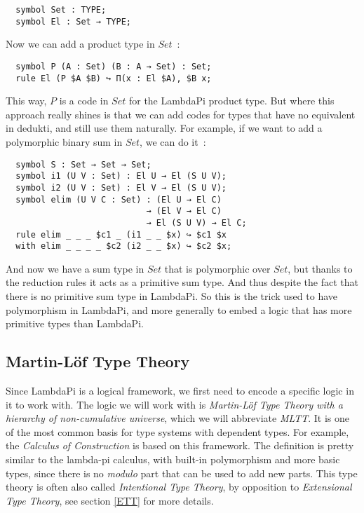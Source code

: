 \begin{lstlisting}
  symbol Set : TYPE;
  symbol El : Set → TYPE;
\end{lstlisting}

Now we can add a product type in $Set$~:

\begin{lstlisting}
  symbol P (A : Set) (B : A → Set) : Set;
  rule El (P $A $B) ↪ Π(x : El $A), $B x;
\end{lstlisting}

This way, $P$ is a code in $Set$ for the LambdaPi product type. But where this
approach really shines is that we can add codes for types that have no
equivalent in dedukti, and still use them naturally. For example, if we want to
add a polymorphic binary sum in $Set$, we can do it~:

\begin{lstlisting}
  symbol S : Set → Set → Set;
  symbol i1 (U V : Set) : El U → El (S U V);
  symbol i2 (U V : Set) : El V → El (S U V);
  symbol elim (U V C : Set) : (El U → El C)
                            → (El V → El C)
                            → El (S U V) → El C;
  rule elim _ _ _ $c1 _ (i1 _ _ $x) ↪ $c1 $x
  with elim _ _ _ _ $c2 (i2 _ _ $x) ↪ $c2 $x;
\end{lstlisting}

And now we have a sum type in $Set$ that is polymorphic over $Set$, but thanks
to the reduction rules it acts as a primitive sum type. And thus despite the
fact that there is no primitive sum type in LambdaPi. So this is the trick used
to have polymorphism in LambdaPi, and more generally to embed a logic that has
more primitive types than LambdaPi.

\subsection{Martin-Löf Type Theory}

Since LambdaPi is a logical framework, we first need to encode a specific logic
in it to work with. The logic we will work with is \emph{Martin-Löf Type Theory
with a hierarchy of non-cumulative universe}, which we will abbreviate
\emph{MLTT}. It is one of the most common basis for type systems with dependent
types. For example, the \emph{Calculus of Construction} is based on this
framework. The definition is pretty similar to the lambda-pi calculus, with
built-in polymorphism and more basic types, since there is no \emph{modulo} part
that can be used to add new parts. This type theory is often also called
\emph{Intentional Type Theory}, by opposition to \emph{Extensional Type Theory},
see section \ref{ETT} for more details.

